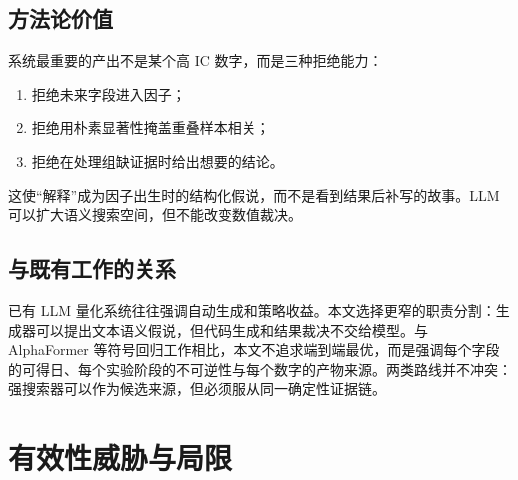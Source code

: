 \documentclass[UTF8,zihao=-4]{ctexart}
\theoremstyle{accentthm}
\begin{document}
\subsection{方法论价值}

系统最重要的产出不是某个高 IC 数字，而是三种拒绝能力：
\begin{enumerate}[leftmargin=2.2em,itemsep=1pt,topsep=2pt]
  \item 拒绝未来字段进入因子；
  \item 拒绝用朴素显著性掩盖重叠样本相关；
  \item 拒绝在处理组缺证据时给出想要的结论。
\end{enumerate}
这使“解释”成为因子出生时的结构化假说，而不是看到结果后补写的故事。LLM 可以扩大语义搜索空间，但不能改变数值裁决。

\subsection{与既有工作的关系}

已有 LLM 量化系统往往强调自动生成和策略收益\cite{kou2025}。本文选择更窄的职责分割：生成器可以提出文本语义假说，但代码生成和结果裁决不交给模型。与 AlphaFormer 等符号回归工作\cite{alphaformer2026}相比，本文不追求端到端最优，而是强调每个字段的可得日、每个实验阶段的不可逆性与每个数字的产物来源。两类路线并不冲突：强搜索器可以作为候选来源，但必须服从同一确定性证据链。

\section{有效性威胁与局限}\label{sec:limitations}
\end{document}
